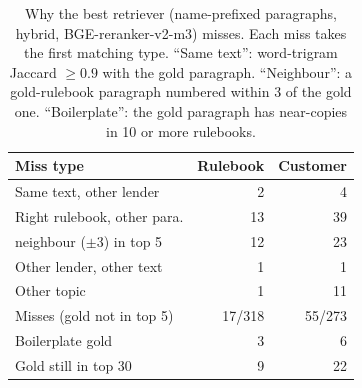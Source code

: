 \begin{table}[t]
\centering\small
\begin{tabular}{lrr}
\toprule
Miss type & Rulebook & Customer \\
\midrule
Same text, other lender & 2 & 4 \\
Right rulebook, other para. & 13 & 39 \\
\quad neighbour ($\pm$3) in top 5 & 12 & 23 \\
Other lender, other text & 1 & 1 \\
Other topic & 1 & 11 \\
\midrule
Misses (gold not in top 5) & 17/318 & 55/273 \\
Boilerplate gold & 3 & 6 \\
Gold still in top 30 & 9 & 22 \\
\bottomrule
\end{tabular}
\caption{Why the best retriever (name-prefixed paragraphs, hybrid, BGE-reranker-v2-m3) misses. Each miss takes the first
matching type. ``Same text'': word-trigram Jaccard $\geq0.9$ with the gold paragraph. ``Neighbour'': a gold-rulebook
paragraph numbered within 3 of the gold one. ``Boilerplate'': the gold paragraph has near-copies in 10 or more rulebooks.}
\label{tab:misses}
\end{table}
